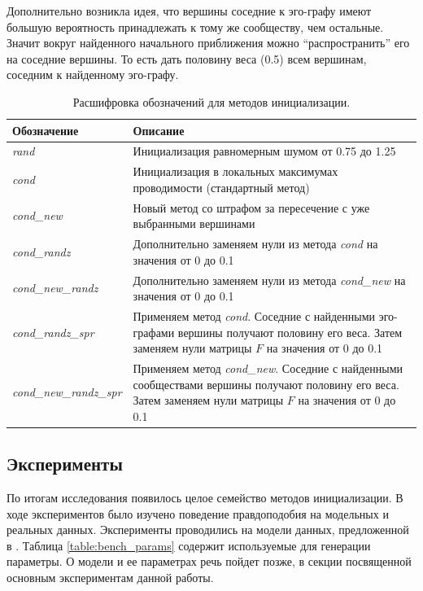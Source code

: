 \documentclass{ITaSconf}
\begin{document}
Дополнительно возникла идея, что вершины соседние к эго-графу имеют большую вероятность принадлежать к тому же сообществу, чем остальные. 
Значит вокруг найденного начального приближения можно ``распространить''  его на соседние вершины. 
То есть дать половину веса (0.5) всем вершинам, соседним к найденному эго-графу.
\begin{center}
	\begin{table}
		\centering
		\begin{tabular}{ p{9.5em}   p{38em} }
			\hline
			\hline
			\textbf{Обозначение} 		& \textbf{Описание} \\
			\hline
			\textit{rand} 				& Инициализация равномерным шумом от 0.75 до 1.25 \\
			\textit{cond} 				& Инициализация в локальных максимумах проводимости (стандартный метод) \\
			\textit{cond\_new} 			& Новый метод со штрафом за пересечение с уже выбранными вершинами \\
			\textit{cond\_randz} 		& Дополнительно заменяем нули из метода \textit{cond} на значения от 0 до 0.1 \\
			\textit{cond\_new\_randz} 	& Дополнительно заменяем нули из метода \textit{cond\_new} на значения от 0 до 0.1 \\
			\textit{cond\_randz\_spr} 	& Применяем метод \textit{cond}. Соседние с найденными эго-графами вершины получают половину его веса. Затем заменяем нули матрицы $F$ на значения от 0 до 0.1 \\
			\textit{cond\_new\_randz\_spr} & Применяем метод \textit{cond\_new}. Соседние с найденными сообществами вершины получают половину его веса. Затем заменяем нули матрицы $F$ на значения от 0 до 0.1 \\
			\hline
			\hline
		\end{tabular}
		\caption{Расшифровка обозначений для методов инициализации.}
		\label{table:init_methods}
	\end{table}
\end{center}
\subsection{Эксперименты} 

По итогам исследования появилось целое семейство методов инициализации. 
В ходе экспериментов было изучено поведение правдоподобия на модельных и реальных данных. 
Эксперименты проводились на модели данных, предложенной в \cite{lancichinetti2009benchmarks}. 
Таблица \ref{table:bench_params} содержит используемые для генерации параметры. 
О модели и ее параметрах речь пойдет позже, в секции посвященной основным экспериментам данной работы.
\end{document}

